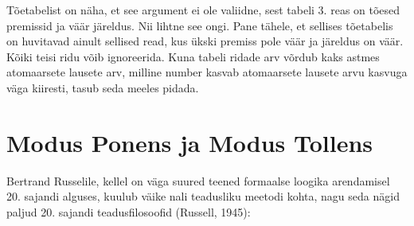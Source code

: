 \documentclass[]{book}
\newenvironment{Shaded}{\begin{snugshade}}{\end{snugshade}}
\newcommand{\KeywordTok}[1]{\textcolor[rgb]{0.13,0.29,0.53}{\textbf{#1}}}
\newcommand{\DataTypeTok}[1]{\textcolor[rgb]{0.13,0.29,0.53}{#1}}
\newcommand{\StringTok}[1]{\textcolor[rgb]{0.31,0.60,0.02}{#1}}
\newcommand{\CommentTok}[1]{\textcolor[rgb]{0.56,0.35,0.01}{\textit{#1}}}
\newcommand{\NormalTok}[1]{#1}
\begin{document}
\begin{Shaded}
\end{Shaded}

Tõetabelist on näha, et see argument ei ole valiidne, sest tabeli 3.
reas on tõesed premissid ja väär järeldus. Nii lihtne see ongi. Pane
tähele, et sellises tõetabelis on huvitavad ainult sellised read, kus
ükski premiss pole väär ja järeldus on väär. Kõiki teisi ridu võib
ignoreerida. Kuna tabeli ridade arv võrdub kaks astmes atomaarsete
lausete arv, milline number kasvab atomaarsete lausete arvu kasvuga väga
kiiresti, tasub seda meeles pidada.

\section{Modus Ponens ja Modus
Tollens}\label{modus-ponens-ja-modus-tollens}

Bertrand Russelile, kellel on väga suured teened formaalse loogika
arendamisel 20. sajandi alguses, kuulub väike nali teadusliku meetodi
kohta, nagu seda nägid paljud 20. sajandi teadusfilosoofid (Russell,
1945):
\end{document}

